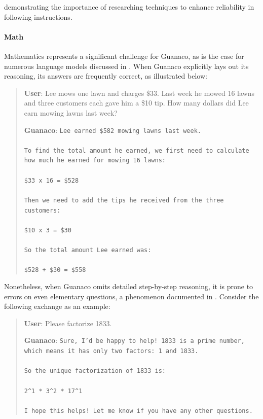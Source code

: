 demonstrating the importance of researching techniques to enhance reliability in following instructions.

\paragraph{Math} Mathematics represents a significant challenge for {Guanaco}, as is the case for numerous language models discussed in \citep{liang2022holistic}. When {Guanaco} explicitly lays out its reasoning, its answers are frequently correct, as illustrated below:

\begin{quote}
    \textbf{User}: Lee mows one lawn and charges \$33. Last week he mowed 16 lawns and three customers each gave him a \$10 tip. How many dollars did Lee earn mowing lawns last week?

    \textbf{Guanaco}: \texttt{Lee earned \$582 mowing lawns last week. \\ \\ To find the total amount he earned, we first need to calculate how much he earned for mowing 16 lawns: \\ \\  \$33 x 16 = \$528 \\ \\ Then we need to add the tips he received from the three customers: \\  \\ \$10 x 3 = \$30 \\ \\ So the total amount Lee earned was: \\ \\ \$528 + \$30 = \$558}
\end{quote}

Nonetheless, when {Guanaco} omits detailed step-by-step reasoning, it is prone to errors on even elementary questions, a phenomenon documented in \cite{weichain}. Consider the following exchange as an example:

\begin{quote}
    \textbf{User}: Please factorize 1833.

    \textbf{Guanaco}: \texttt{Sure, I'd be happy to help! 1833 is a prime number, which means it has only two factors: 1 and 1833. \\ \\ So the unique factorization of 1833 is: \\ \\ 2\^{}1 * 3\^{}2 * 17\^{}1 \\ \\ I hope this helps! Let me know if you have any other questions.}
\end{quote}

